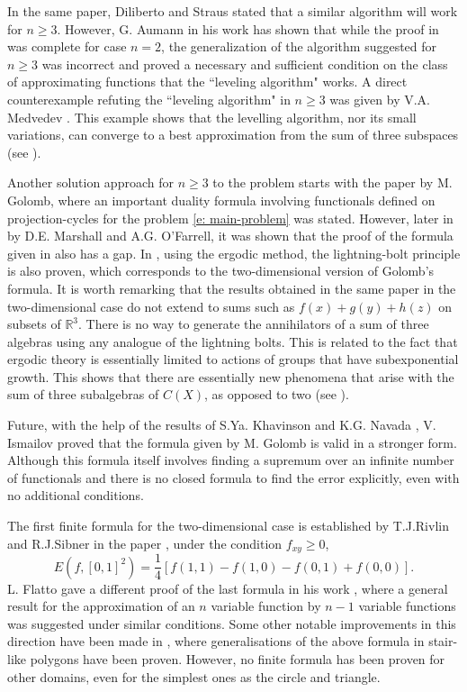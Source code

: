 \documentclass[12p]{article}
\numberwithin{equation}{section}
\begin{document}
In the same paper, Diliberto and Straus stated that a similar algorithm will work for \(n \ge 3\). However, G. Aumann in his work \cite{Aumann} has shown that while the proof in \cite{Diliberto_Straus} was complete for case \(n=2\), the generalization of the algorithm suggested for \(n \ge 3\) was incorrect and proved a necessary and sufficient condition on the class of approximating functions that the “leveling algorithm" works. A direct counterexample refuting the “leveling algorithm" in \(n \ge 3\) was given by V.A. Medvedev \cite{Medvedev}. This example shows that the levelling algorithm, nor its small variations, can converge to a best approximation from the sum of three subspaces (see \cite{Pinkus}).

Another solution approach for \(n \ge 3\) to the problem starts with the paper \cite{Golomb} by M. Golomb, where an important duality formula involving functionals defined on projection-cycles for the problem \eqref{e: main-problem} was stated. However, later in \cite{Marshall_Farrel} by D.E. Marshall and A.G. O'Farrell, it was shown that the proof of the formula given in \cite{Golomb} also has a gap. In \cite{Marshall_Farrel}, using the ergodic method, the lightning-bolt principle is also proven, which corresponds to the two-dimensional version of Golomb's formula. It is worth remarking that the results obtained in the same paper in the two-dimensional case do not extend to sums such as $f (x)+g(y)+h(z)$ on subsets of \(\mathbb{R}^3\). There is no way to generate the annihilators of a sum of three algebras using any analogue of the lightning bolts. This is related to the fact that ergodic theory is essentially limited to actions of groups that have subexponential growth.  This shows that there are essentially new phenomena that arise with the sum of three subalgebras of \(C(X)\), as opposed to two (see \cite{O'Farrel}).

Future, with the help of the results of S.Ya. Khavinson \cite{Khavinson} and K.G. Navada \cite{Navada}, V. Ismailov \cite{Ismailov_2009} proved that the formula given by M. Golomb is valid in a stronger form. Although this formula itself involves finding a supremum over an infinite number of functionals and there is no closed formula to find the error explicitly, even with no additional conditions.

The first finite formula for the two-dimensional case is established by T.J.Rivlin and R.J.Sibner in the paper \cite{Rivlin_Sibner}, under the condition \(f_{xy} \ge 0\), 
\[  E(f,[0,1]^2)=\frac{1}{4}[f(1,1)-f(1,0)-f(0,1)+f(0,0)]. \]
L. Flatto gave a different proof of the last formula in his work \cite{Flatto}, where a general result for the approximation of an \(n\) variable function by \(n-1\) variable functions was suggested under similar conditions.
Some other notable improvements in this direction have been made in \cite{Muhammad} \cite{Ismailov_2021}, where generalisations of the above formula in stair-like polygons have been proven. However, no finite formula has been proven for other domains, even for the simplest ones as the circle and triangle.
\end{document}
